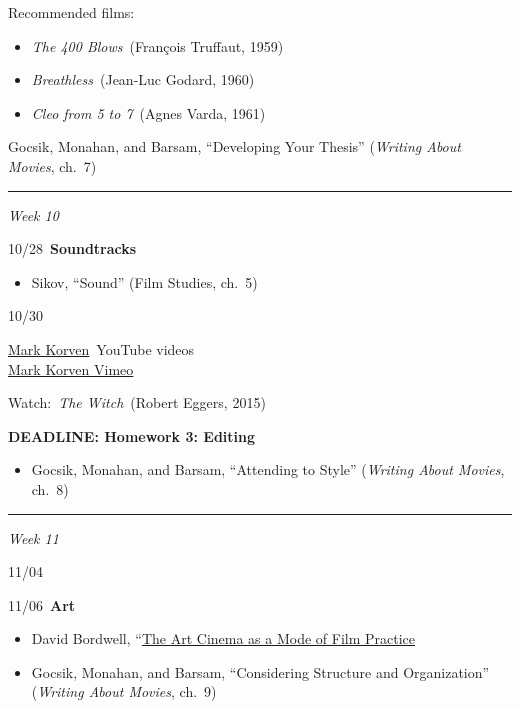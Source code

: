 \documentclass[
  letterpaper,
  DIV=11,
  numbers=noendperiod,
  oneside]{scrartcl}
\providecommand{\tightlist}{%
  \setlength{\itemsep}{0pt}\setlength{\parskip}{0pt}}
\begin{document}
Recommended films:

\begin{itemize}
\tightlist
\item
  \emph{The 400 Blows}~(François Truffaut, 1959)\\
\item
  \emph{Breathless}~(Jean-Luc Godard, 1960)\\
\item
  \emph{Cleo from 5 to 7}~(Agnes Varda, 1961)
\end{itemize}

Gocsik, Monahan, and Barsam, ``Developing Your Thesis'' (\emph{Writing
About Movies}, ch.~7)

\begin{center}\rule{0.5\linewidth}{0.5pt}\end{center}

\emph{Week 10}

10/28~\textbf{Soundtracks}

\begin{itemize}
\tightlist
\item
  Sikov, ``Sound'' (Film Studies, ch.~5)
\end{itemize}

10/30~

\href{https://markkorven.com/}{Mark Korven}~YouTube videos\\
\href{https://vimeo.com/user3424223}{Mark Korven Vimeo}

Watch:~\emph{The Witch}~(Robert Eggers, 2015)

\textbf{DEADLINE: Homework 3: Editing}

\begin{itemize}
\tightlist
\item
  Gocsik, Monahan, and Barsam, ``Attending to Style'' (\emph{Writing
  About Movies}, ch.~8)
\end{itemize}

\begin{center}\rule{0.5\linewidth}{0.5pt}\end{center}

\emph{Week 11}

11/04~

11/06~\textbf{Art}

\begin{itemize}
\item
  David Bordwell, ``\href{pdf/bordwell-art-cinema.pdf}{The Art Cinema as
  a Mode of Film Practice}
\item
  Gocsik, Monahan, and Barsam, ``Considering Structure and
  Organization'' (\emph{Writing About Movies}, ch.~9)
\end{itemize}
\end{document}
